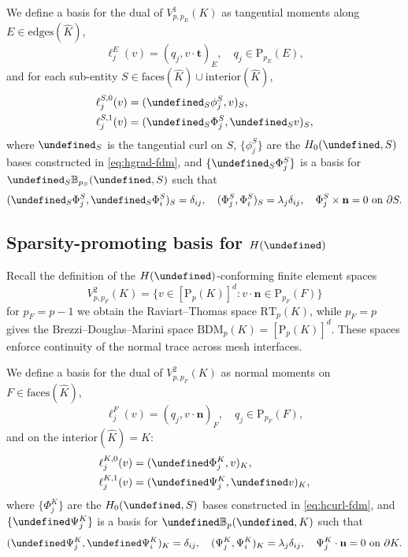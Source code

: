 \documentclass[review,onefignum,onetabnum,a4paper]{siamart190516}
\let\grad\undefined
\let\curl\undefined
\let\div\undefined
\DeclareMathOperator{\grad}{grad}
\DeclareMathOperator{\curl}{curl}
\DeclareMathOperator{\div}{div}
\newcommand{\Hdiv}{H(\div)}
\renewcommand{\vec}[1]{\mathbf{#1}}
\newcommand{\bn}{\vec{n}}
\newcommand{\bt}{\vec{t}}
\newcommand{\Khat}{\hat{K}}
\renewcommand{\P}{\mathrm{P}}
\newcommand{\RT}{\mathrm{RT}}
\newcommand{\BDM}{\mathrm{BDM}}
\begin{document}
We define a basis for the dual of $V^1_{p, p_E}(K)$ as 
tangential moments along $E\in \text{edges}(\Khat)$,
\begin{equation}
   \ell^E_j(v) = (q_j, v\cdot \bt)_E, \quad q_j \in \P_{p_E}(E), 
\end{equation}
and for each sub-entity $S \in \text{faces}(\Khat) \cup \text{interior}(\Khat)$,
\begin{align}
   \ell^{S,0}_j(v) &= (\grad_S\phi^S_j, v)_{S}, \\
   \ell^{S,1}_j(v) &= (\curl_S\Phi^S_j, \curl_S v)_{S}, \label{eq:hcurl-interior-dofs}
\end{align}
where $\curl_S$ is the tangential curl on $S$,
$\{\phi^S_j\}$ are the $H_0(\grad, S)$ bases constructed in \eqref{eq:hgrad-fdm},
and $\{\curl_S\Phi^S_j\}$ is a basis for $\curl_S \mathbb{B}_{p_S}(\curl, S)$
such that
\begin{equation} \label{eq:hcurl-fdm}
   (\curl_S\Phi^S_j, \curl_S\Phi^S_i)_{S} = \delta_{ij}, \quad
   (\Phi^S_j, \Phi^S_i)_{S} = \lambda_j\delta_{ij}, \quad
   \Phi^S_j\times\bn = 0 \text{ on }\partial S.
\end{equation}


\subsection{Sparsity-promoting basis for $\Hdiv$}

Recall the definition of the $\Hdiv$-conforming finite element spaces
\begin{equation}
V^2_{p, p_F}(K) = \{v\in [\P_p(K)]^d : v\cdot\bn \in \P_{p_F}(F) \}
\end{equation}
for $p_F=p-1$ we obtain the Raviart--Thomas space $\RT_p(K)$, while
$p_F=p$ gives the Brezzi--Douglas--Marini space $\BDM_p(K) = [\P_p(K)]^d$. 
These spaces enforce continuity of the normal trace across mesh interfaces.

We define a basis for the dual of $V^2_{p, p_F}(K)$ as normal moments on $F\in
\text{faces}(\Khat)$,
\begin{equation}
   \ell^F_j(v) = (q_j, v\cdot \bn)_F, \quad q_j \in \P_{p_F}(F),
\end{equation}
and on the $\text{interior}(\Khat) = K$: 
\begin{align}
   \ell^{K,0}_j(v) &= (\curl\Phi^K_j, v)_{K}, \\
   \ell^{K,1}_j(v) &= (\div\Psi^K_j, \div v)_{K}, \label{eq:hdiv-interior-dofs}
\end{align}
where $\{\Phi^K_j\}$ are the $H_0(\curl, S)$ bases constructed in
\eqref{eq:hcurl-fdm}, and $\{\div\Psi^K_j\}$ is a basis for $\div
\mathbb{B}_p(\div, K)$ such that
\begin{equation} \label{eq:hdiv-fdm}
   (\div\Psi^K_j, \div\Psi^K_i)_K = \delta_{ij}, \quad
   (\Psi^K_j, \Psi^K_i)_{K} = \lambda_j\delta_{ij}, \quad
   \Psi^K_j\cdot\bn = 0 \text{ on }\partial K.
\end{equation}
\end{document}
